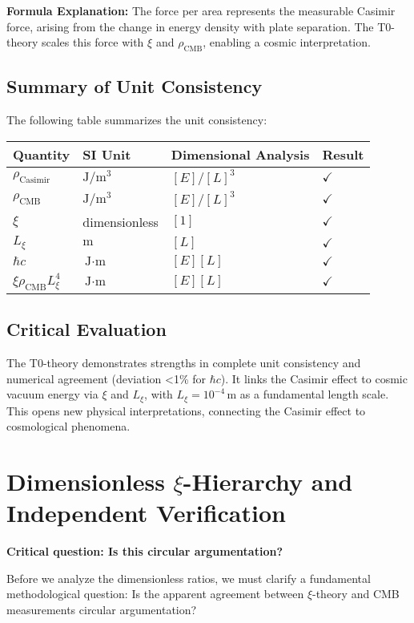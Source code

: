 \documentclass[12pt,a4paper]{article}
\begin{document}
\textbf{Formula Explanation:} The force per area represents the measurable Casimir force, arising from the change in energy density with plate separation. The T0-theory scales this force with $\xi$ and $\rho_{\text{CMB}}$, enabling a cosmic interpretation.

\subsection{Summary of Unit Consistency}
The following table summarizes the unit consistency:
\begin{table}[h]
	\centering
	\begin{tabular}{l l l l}
		\toprule
		Quantity & SI Unit & Dimensional Analysis & Result \\
		\midrule
		$\rho_{\text{Casimir}}$ & $\text{J}/\text{m}^3$ & $[E]/[L]^3$ & $\checkmark$ \\
		$\rho_{\text{CMB}}$ & $\text{J}/\text{m}^3$ & $[E]/[L]^3$ & $\checkmark$ \\
		$\xi$ & dimensionless & $[1]$ & $\checkmark$ \\
		$L_\xi$ & $\text{m}$ & $[L]$ & $\checkmark$ \\
		$\hbar c$ & $\text{J} \cdot \text{m}$ & $[E][L]$ & $\checkmark$ \\
		$\xi \rho_{\text{CMB}} L_\xi^4$ & $\text{J} \cdot \text{m}$ & $[E][L]$ & $\checkmark$ \\
		\bottomrule
	\end{tabular}
\end{table}

\subsection{Critical Evaluation}
The T0-theory demonstrates strengths in complete unit consistency and numerical agreement (deviation <1\% for $\hbar c$). It links the Casimir effect to cosmic vacuum energy via $\xi$ and $L_\xi$, with $L_\xi = 10^{-4} \, \text{m}$ as a fundamental length scale. This opens new physical interpretations, connecting the Casimir effect to cosmological phenomena.
	
	\section{Dimensionless $\xi$-Hierarchy and Independent Verification}
	
	\textbf{Critical question: Is this circular argumentation?}
	
	Before we analyze the dimensionless ratios, we must clarify a fundamental methodological question: Is the apparent agreement between $\xi$-theory and CMB measurements circular argumentation?
	
\end{document}

